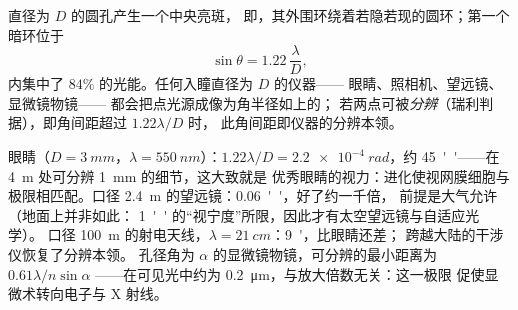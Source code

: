 \begin{proposition}\label{prop:b2:diffraction:airy}
直径为 $D$ 的圆孔产生一个中央亮斑，
即\emph{}，其外围环绕着若隐若现的圆环；第一个暗环位于
\[
\sin\theta = 1.22\,\frac\lambda D ,
\]
内集中了 $84\%$ 的光能。任何入瞳直径为 $D$ 的仪器——
眼睛、照相机、望远镜、显微镜物镜——
都会把点光源成像为角半径如上的；
若两点可被\emph{分辨}（瑞利判据），即角间距超过
$1.22\lambda/D$ 时，
此角间距即仪器的分辨本领。
\end{proposition}
\admitted

\begin{example}\label{ex:b2:diffraction:instruments}
眼睛（$D = \qty{3}{mm}$，$\lambda = \qty{550}{nm}$）：$1.22\lambda/D = \qty{2.2e-4}{rad}$，约
\qty{45}{''}——在 \qty{4}{m} 处可分辨 \qty{1}{mm} 的细节，这大致就是
优秀眼睛的视力：进化使视网膜细胞与
极限相匹配。口径 \qty{2.4}{m} 的望远镜：\qty{0.06}{''}，好了约一千倍，
前提是大气允许（地面上并非如此：
\qty{1}{''} 的“视宁度”所限，因此才有太空望远镜与自适应光学）。
口径 \qty{100}{m} 的射电天线，$\lambda = \qty{21}{cm}$：\qty{9}{'}，比眼睛还差；
跨越大陆的干涉仪恢复了分辨本领。
孔径角为 $\alpha$ 的显微镜物镜，可分辨的最小距离为 $0.61\lambda/n\sin\alpha$
——在可见光中约为 \qty{0.2}{\micro m}，与放大倍数无关：这一极限
促使显微术转向电子与 X 射线。
\end{example}


